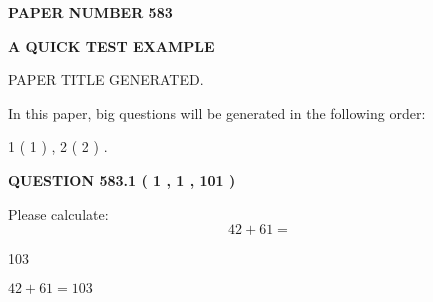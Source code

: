 \documentclass[12pt]{article}
\begin{document}
   
   
   
\newpage 
\setcounter{page}{ 
   583001 } 
   
   
   
   
 {\textbf{ \Large{ PAPER NUMBER  583  }}}
   
   
\vspace{0.2in}
   
   
   
   
   
   
   
   
 \vspace{0.2in}
{\LARGE {\textbf{ A QUICK TEST EXAMPLE}}}
   
   
 PAPER TITLE GENERATED.
   
   
   
\vspace{0.2in}
   
In this paper, big questions will be generated in the following order: 
   
   
   1 ( 1 )
 ,
   2 ( 2 )
 .
  
\vspace{0.2in}
  
{\textbf{\Large{QUESTION
583.1 
 ( 1 , 1 , 101 )
}}}
  
  
 
Please calculate:
\begin{equation}
42 +  %
61 = \nonumber
\end{equation}
 
 
 
\noindent{}
 
 

103
 
 
\noindent{}
 
 

 
 
 
\noindent{}
 
 

$ %
42 +  %
61=   %
103$
 
 
\noindent{}
 
 

 
   
\end{document}
